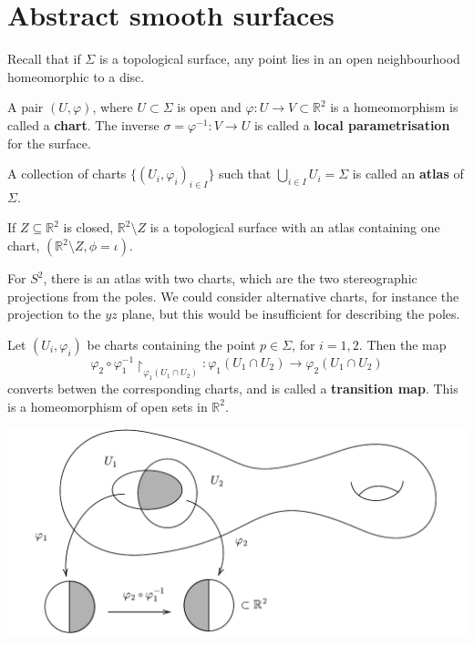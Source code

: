 \documentclass[a4paper,11pt]{article}
\begin{document}
\section{Abstract smooth surfaces}
Recall that if \( \Sigma \) is a topological surface, any point lies in an open neighbourhood homeomorphic to a disc.
\begin{definition}
	A pair \( (U, \varphi) \), where $ U \subset \Sigma $ is open and $ \varphi:U\to V \subset \mathbb{R}^{2} $ is a homeomorphism is called a \textbf{chart}. The inverse \( \sigma = \varphi^{-1} \colon V \to U \) is called a \textbf{local parametrisation} for the surface.
\end{definition}

\begin{definition}
	A collection of charts $ \{(U_i,\varphi_i)_{i\in I}\} $ such that $ \bigcup_{i\in I} U_i = \Sigma $ is called an \textbf{atlas} of $\Sigma$. 
\end{definition}
\begin{example}
	If \( Z \subseteq \mathbb R^2 \) is closed, \( \mathbb R^2 \setminus Z \) is a topological surface with an atlas containing one chart, \( (\mathbb R^2 \setminus Z, \phi = \iota) \).

	For \( S^2 \), there is an atlas with two charts, which are the two stereographic projections from the poles.
	We could consider alternative charts, for instance the projection to the \( yz \) plane, but this would be insufficient for describing the poles.
\end{example}
\begin{definition}
	Let \( (U_i, \varphi_i) \) be charts containing the point \( p \in \Sigma \), for \( i = 1, 2 \).
	Then the map
	\[
		\varphi_2 \circ\varphi_1^{-1}\restriction_{\varphi_1(U_1 \cap U_2)} \colon \varphi_1(U_1 \cap U_2) \to \varphi_2(U_1 \cap U_2)
	\]
	converts betwen the corresponding charts, and is called a \textbf{transition map}.
	This is a homeomorphism of open sets in \( \mathbb R^2 \).
\end{definition}

\begin{center}
\includegraphics[scale=.7]{Geo1}
\end{center}
\end{document}
